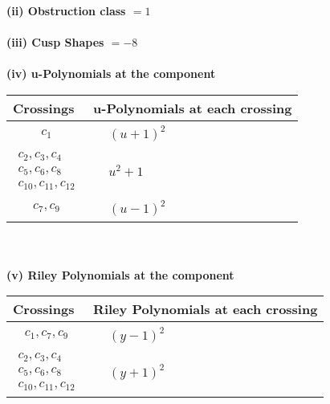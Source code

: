 \documentclass[1p]{elsarticle_modified}
\theoremstyle{definition}
\begin{document}
\flushleft \textbf{(ii) Obstruction class $= 1$}\\~\\
\flushleft \textbf{(iii) Cusp Shapes $= -8$}\\~\\
\newpage\renewcommand{\arraystretch}{1}
\flushleft \textbf{(iv) u-Polynomials at the component}\newline \\
\begin{tabular}{m{50pt}|m{274pt}}
Crossings & \hspace{64pt}u-Polynomials at each crossing \\
\hline $$\begin{aligned}c_{1}\end{aligned}$$&$\begin{aligned}
&(u+1)^2
\end{aligned}$\\
\hline $$\begin{aligned}c_{2},c_{3},c_{4}\\c_{5},c_{6},c_{8}\\c_{10},c_{11},c_{12}\end{aligned}$$&$\begin{aligned}
&u^2+1
\end{aligned}$\\
\hline $$\begin{aligned}c_{7},c_{9}\end{aligned}$$&$\begin{aligned}
&(u-1)^2
\end{aligned}$\\
\hline
\end{tabular}\\~\\
\newpage\renewcommand{\arraystretch}{1}
\flushleft \textbf{(v) Riley Polynomials at the component}\newline \\
\begin{tabular}{m{50pt}|m{274pt}}
Crossings & \hspace{64pt}Riley Polynomials at each crossing \\
\hline $$\begin{aligned}c_{1},c_{7},c_{9}\end{aligned}$$&$\begin{aligned}
&(y-1)^2
\end{aligned}$\\
\hline $$\begin{aligned}c_{2},c_{3},c_{4}\\c_{5},c_{6},c_{8}\\c_{10},c_{11},c_{12}\end{aligned}$$&$\begin{aligned}
&(y+1)^2
\end{aligned}$\\
\hline
\end{tabular}\\~\\
\end{document}
